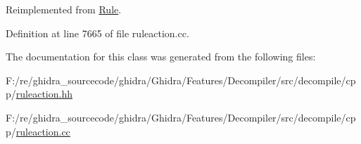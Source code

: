 Reimplemented from \mbox{\hyperlink{class_rule_a4023bfc7825de0ab866790551856d10e}{Rule}}.



Definition at line 7665 of file ruleaction.\+cc.



The documentation for this class was generated from the following files\+:\begin{DoxyCompactItemize}
\item 
F\+:/re/ghidra\+\_\+sourcecode/ghidra/\+Ghidra/\+Features/\+Decompiler/src/decompile/cpp/\mbox{\hyperlink{ruleaction_8hh}{ruleaction.\+hh}}\item 
F\+:/re/ghidra\+\_\+sourcecode/ghidra/\+Ghidra/\+Features/\+Decompiler/src/decompile/cpp/\mbox{\hyperlink{ruleaction_8cc}{ruleaction.\+cc}}\end{DoxyCompactItemize}
